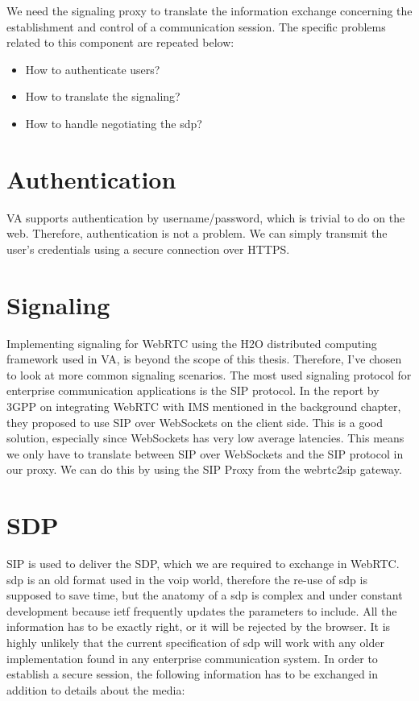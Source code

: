 We need the signaling proxy to translate the information exchange concerning the establishment and control of a communication session. The specific problems related to this component are repeated below:

\begin{itemize}
\item{How to authenticate users?}
\item{How to translate the signaling?}
\item{How to handle negotiating the \gls{sdp}?}
\end{itemize}

\section{Authentication}
VA supports authentication by username/password, which is trivial to do on the web. Therefore, authentication is not a problem. We can simply transmit the user's credentials using a secure connection over HTTPS.

\section{Signaling}
Implementing signaling for WebRTC using the H2O distributed computing framework used in VA, is beyond the scope of this thesis. Therefore, I've chosen to look at more common signaling scenarios. The most used signaling protocol for enterprise communication applications is the SIP protocol. In the report by 3GPP\cite{3gpp-wrtc-access-ims} on integrating WebRTC with IMS mentioned in the background chapter, they proposed to use SIP over WebSockets on the client side. This is a good solution, especially since WebSockets has very low average latencies\cite{websocket-overhead}. This means we only have to translate between SIP over WebSockets and the SIP protocol in our proxy. We can do this by using the SIP Proxy from the webrtc2sip gateway.

\section{SDP}
SIP is used to deliver the SDP, which we are required to exchange in WebRTC. \gls{sdp} is an old format used in the \gls{voip} world, therefore the re-use of \gls{sdp} is supposed to save time, but the anatomy of a \gls{sdp} is complex and under constant development because \gls{ietf} frequently updates the parameters to include. All the information has to be exactly right, or it will be rejected by the browser. It is highly unlikely that the current specification of \gls{sdp} will work with any older implementation found in any enterprise communication system. In order to establish a secure session, the following information has to be exchanged in addition to details about the media:

